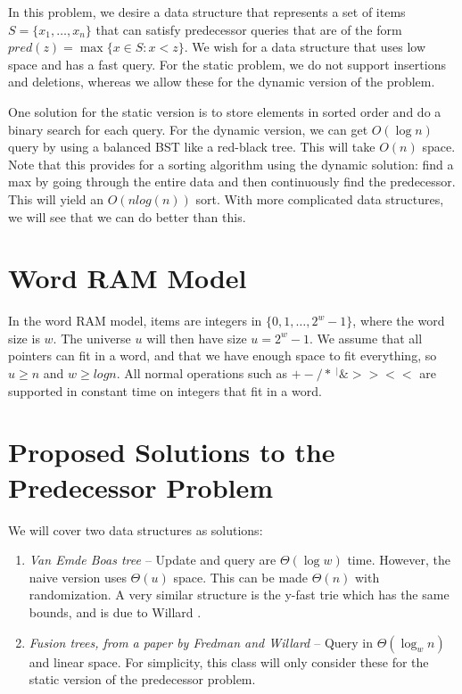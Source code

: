 \documentclass[11pt]{article}
\begin{document}
In this problem, we desire a data structure that represents a set of items $S = \{x_1, \ldots, x_n\}$ that can satisfy predecessor queries that are of the form
$pred(z) = \max\{x \in S: x < z\}$. We wish for a data structure that uses low space and has a fast query. For the static problem, we do not support insertions and deletions, whereas we allow these for the dynamic version of the problem. 

One solution for the static version is to store elements in sorted order and do a binary search for each query. For the dynamic version, we can get $O(\log{n})$  query by using a balanced BST like a red-black tree. This will take $O(n)$ space. Note that this provides for a sorting algorithm using the dynamic solution: find a max by going through the entire data and then continuously find the predecessor. This will yield an $O(n log(n))$ sort. With more complicated data structures, we will see that we can do better than this. 

\section{Word RAM Model}
In the word RAM model, items are integers in $\{0, 1, \ldots, 2^{w} - 1\}$, where the word size is $w$. The universe $u$ will then have size $u = 2^w - 1$. 
We assume that all pointers can fit in a word, and that we have enough space to fit everything, so $u \ge n$ and $w \ge log {n}$. All normal operations such as $+ - / * ~ ^ | \& >> <<$ are supported in constant time on integers that fit in a word.

\section{Proposed Solutions to the Predecessor Problem}
We will cover two data structures as solutions:
\begin{enumerate}
\item {\em Van Emde Boas tree \cite{VEB75}} -- Update and query are $\Theta(\log{w})$ time. However, the naive version uses $\Theta(u)$ space. This can be made $\Theta(n)$ with randomization. A very similar structure is the y-fast trie which has the same bounds, and is due to Willard \cite{Willard83}.
\item {\em Fusion trees, from a paper by Fredman and Willard \cite{Fredman93}} -- Query in $\Theta(\log_w{n})$ and linear space. For simplicity, this class will only consider these for the static version of the predecessor problem.
\end{enumerate}
\end{document}
